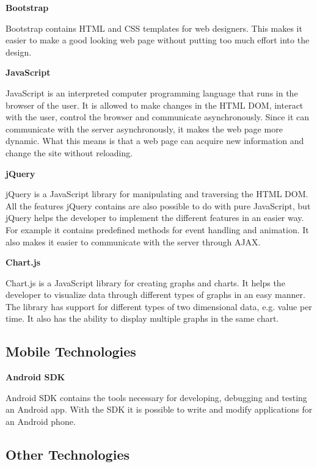\textbf{Bootstrap} \nocite{Bootstrap}

Bootstrap contains HTML and CSS templates for web designers.
This makes it easier to make a good looking web page without putting too much effort into the design.

\textbf{JavaScript} \nocite{JavaScript}

JavaScript is an interpreted computer programming language that runs in the browser of the user.
It is allowed to make changes in the HTML DOM, interact with the user, control the browser and communicate asynchronously.
Since it can communicate with the server asynchronously, it makes the web page more dynamic.
What this means is that a web page can acquire new information and change the site without reloading.

\textbf{jQuery} \nocite{jQuery}

jQuery is a JavaScript library for manipulating and traversing the HTML DOM.
All the features jQuery contains are also possible to do with pure JavaScript, but jQuery helps the developer to implement the different features in an easier way.
For example it contains predefined methods for event handling and animation.
It also makes it easier to communicate with the server through AJAX.

\textbf{Chart.js} \nocite{Chartjs}

Chart.js is a JavaScript library for creating graphs and charts.
It helps the developer to visualize data through different types of graphs in an easy manner.
The library has support for different types of two dimensional data, e.g. value per time.
It also has the ability to display multiple graphs in the same chart.

\subsection{Mobile Technologies}

\textbf{Android SDK} \nocite{AndroidSDK}

Android SDK contains the tools necessary for developing, debugging and testing an Android app.
With the SDK it is possible to write and modify applications for an Android phone.

\subsection{Other Technologies}


